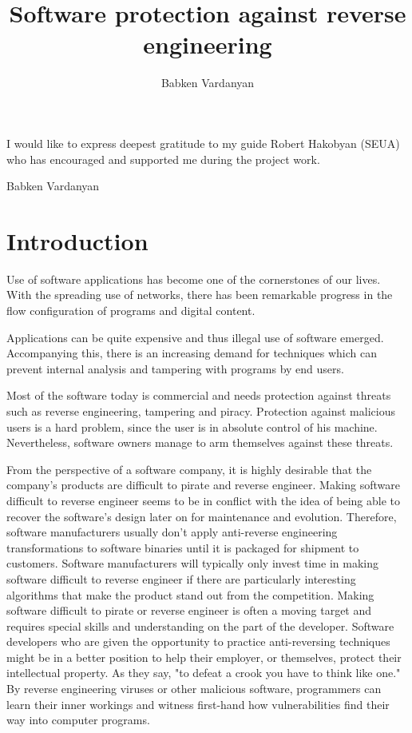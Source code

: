 \documentclass[a4paper,12pt]{article}
\author{Babken Vardanyan}
\title{Software protection against reverse engineering}
\date{}
\begin{document}

I would like to express deepest gratitude to my guide Robert Hakobyan
(SEUA) who has encouraged and supported me during the project work.

\hfill \hfill Babken Vardanyan

\newpage

\tableofcontents
\newpage

\section{Introduction}
Use of software applications has become one of the cornerstones of our lives.
With the spreading use of networks, there has been remarkable progress in the
flow configuration of programs and digital content.

Applications can be quite expensive and thus illegal use of software emerged.
Accompanying this, there is an increasing demand for techniques which can
prevent internal analysis and tampering with programs by end users.

Most of the software today is commercial and needs protection against threats
such as reverse engineering, tampering and piracy. Protection against
malicious users is a hard problem, since the user is in absolute control of
his machine. Nevertheless, software owners manage to arm themselves against
these threats.

From the perspective of a software company, it is highly desirable that the
company's products are difficult to pirate and reverse engineer. Making
software difficult to reverse engineer seems to be in conflict with the idea
of being able to recover the software's design later on for maintenance and
evolution. Therefore, software manufacturers usually don't apply anti-reverse
engineering transformations to software binaries until it is packaged for
shipment to customers. Software manufacturers will typically only invest time
in making software difficult to reverse engineer if there are particularly
interesting algorithms that make the product stand out from the competition.
Making software difficult to pirate or reverse engineer is often a moving
target and requires special skills and understanding on the part of the
developer. Software developers who are given the opportunity to practice
anti-reversing techniques might be in a better position to help their
employer, or themselves, protect their intellectual property. As they say,
"to defeat a crook you have to think like one." By reverse engineering
viruses or other malicious software, programmers can learn their inner
workings and witness first-hand how vulnerabilities find their way into
computer programs.
\end{document}
